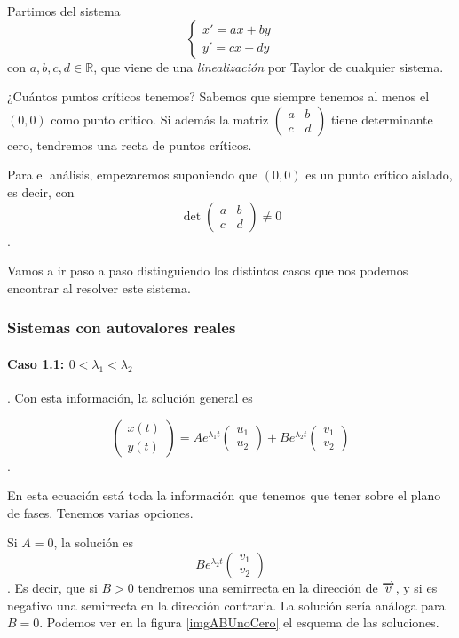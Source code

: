 Partimos del sistema \[ \begin{cases} x' = ax + by \\ y' = cx + dy \end{cases} \] con $a,b,c,d∈ℝ$, que viene de una \textit{linealización} por Taylor de cualquier sistema.

¿Cuántos puntos críticos tenemos? Sabemos que siempre tenemos al menos el $(0,0)$ como punto crítico. Si además la matriz $\begin{pmatrix} a & b \\ c & d \end{pmatrix}$ tiene determinante cero, tendremos una recta de puntos críticos.

Para el análisis, empezaremos suponiendo que $(0,0)$ es un punto crítico aislado, es decir, con \[ \det \begin{pmatrix} a & b \\ c & d \end{pmatrix} ≠ 0 \].

Vamos a ir paso a paso distinguiendo los distintos casos que nos podemos encontrar al resolver este sistema.

\subsubsection{Sistemas con autovalores reales}

\paragraph{Caso 1.1: $0< λ_1 < λ_2$}. Con esta información, la solución general es

\[ \begin{pmatrix} x(t) \\ y(t) \end{pmatrix} = A e^{λ_1t}\begin{pmatrix} u_1 \\ u_2\end{pmatrix} + B e^{λ_2t} \begin{pmatrix} v_1 \\ v_2 \end{pmatrix} \].

En esta ecuación está toda la información que tenemos que tener sobre el plano de fases. Tenemos varias opciones.

Si $A = 0$, la solución es \[ B e^{λ_2t} \begin{pmatrix} v_1 \\ v_2 \end{pmatrix} \]. Es decir, que si $B>0$ tendremos una semirrecta en la dirección de $\overrightarrow{v}$, y si es negativo una semirrecta en la dirección contraria. La solución sería análoga para $B=0$. Podemos ver en la figura \ref{imgABUnoCero} el esquema de las soluciones.

